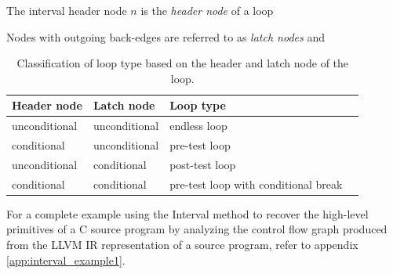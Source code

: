 The interval header node $n$ is the \textit{header node} of a loop

Nodes with outgoing back-edges are referred to as \textit{latch nodes} and


\begin{table}[htbp]
	\begin{center}
		\begin{tabular}{|l|l|l|l|}
			\hline
			\textbf{Header node} & \textbf{Latch node} & \textbf{Loop type} \\
			\hline
			unconditional & unconditional & endless loop                         \\
			\hline
			conditional   & unconditional & pre-test loop                        \\
			\hline
			unconditional & conditional   & post-test loop                       \\
			\hline
			conditional   & conditional   & pre-test loop with conditional break \\
			\hline
		\end{tabular}
	\end{center}
	\label{tbl:loop_classification}
	\caption{Classification of loop type based on the header and latch node of the loop.}
\end{table}


For a complete example using the Interval method to recover the high-level primitives
of a C source program by analyzing the control flow graph produced from the LLVM IR
representation of a source program, refer to appendix \ref{app:interval_example1}.
